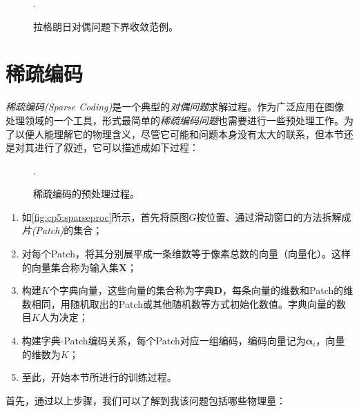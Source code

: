 \begin{figure}[htbp]
	\centering
	\begin{minipage}[b]{0.48\textwidth}
	\end{minipage}
	\begin{minipage}[b]{0.48\textwidth}
    \end{minipage}
	\DeclareGraphicsExtensions.
	\caption{拉格朗日对偶问题下界收敛范例。}
	\label{fig:cp5:lagbound}
\end{figure}

\section{稀疏编码}
\emph{稀疏编码(Sparse Coding)}是一个典型的\emph{对偶问题}求解过程。作为广泛应用在图像处理领域的一个工具，形式最简单的\emph{稀疏编码问题}也需要进行一些预处理工作。为了以便人能理解它的物理含义，尽管它可能和问题本身没有太大的联系，但本节还是对其进行了叙述，它可以描述成如下过程：

\begin{figure}[H]
	\centering
	\DeclareGraphicsExtensions.
	\caption{稀疏编码的预处理过程。}
	\label{fig:cp5:sparseproc}
\end{figure}

\begin{enumerate}[label=(\arabic*)]
	\item 如\autoref{fig:cp5:sparseproc}所示，首先将原图$G$按位置、通过滑动窗口的方法拆解成\emph{片(Patch)}的集合；
	\item 对每个Patch，将其分别展平成一条维数等于像素总数的向量（向量化）。这样的向量集合称为输入集$\mathbf{X}$；
	\item 构建$K$个字典向量，这些向量的集合称为字典$\mathbf{D}$，每条向量的维数和Patch的维数相同，用随机取出的Patch或其他随机数等方式初始化数值。字典向量的数目$K$人为决定；
	\item 构建字典-Patch编码关系，每个Patch对应一组编码，编码向量记为$\bm{\alpha}_i$，向量的维数为$K$；
	\item 至此，开始本节所进行的训练过程。
\end{enumerate}

首先，通过以上步骤，我们可以了解到我该问题包括哪些物理量：

